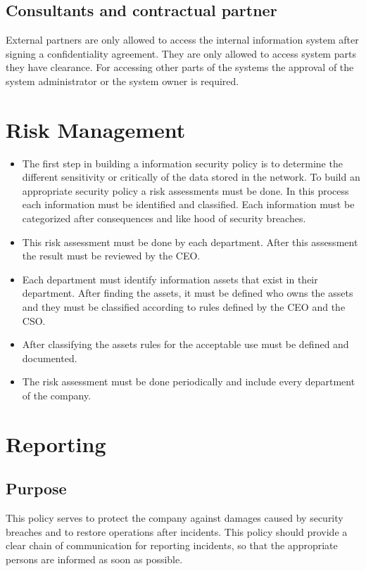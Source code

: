 \section{Consultants and contractual partner}
External partners are only allowed to access the internal information system after signing a confidentiality agreement. They are only allowed to access system parts they have clearance. For accessing other parts of the systems the approval of the system administrator or the system owner is required. 
\chapter{Risk Management}
\begin{itemize}
\item The first step in building a information security policy is to determine the different sensitivity or critically of the data stored in the network. To build an appropriate security policy a risk assessments must be done. In this process each information must be identified and classified.  Each information must be categorized after consequences and like hood of security breaches\cite{Host}. 
\item This risk assessment must be done by each department.  After this assessment the result must be reviewed by the CEO. 
\item Each department must identify information assets that exist in their department.  After finding the assets, it must be defined who owns the assets and they must be classified according to rules defined by the CEO and the CSO.
\item After classifying the assets rules for  the acceptable use must be defined and documented. 
\item The risk assessment must be done periodically and include every department of the company. 
\end{itemize}
\chapter{Reporting}
\section{Purpose}
This policy serves to protect the company against damages caused  by security breaches and to restore operations after incidents. This policy should provide a clear chain of communication for reporting incidents, so that the appropriate persons are informed as soon as possible\cite{Ox}. 
